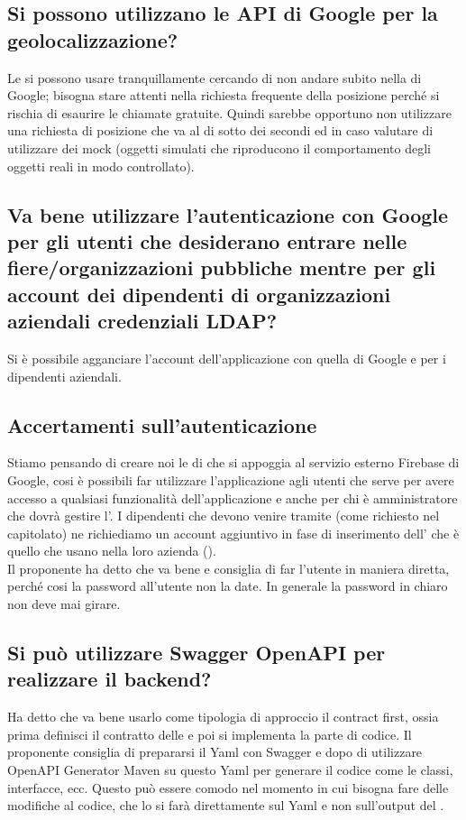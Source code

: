 \subsection{Si possono utilizzano le API di Google per la geolocalizzazione?}
Le si possono usare tranquillamente cercando di non andare subito nella  di Google; bisogna stare attenti nella richiesta frequente della posizione perché si rischia 
di esaurire le chiamate gratuite. Quindi sarebbe opportuno non utilizzare una richiesta di posizione che va al di sotto dei secondi ed in caso valutare di utilizzare dei 
mock (oggetti simulati che riproducono il comportamento degli oggetti reali in modo controllato).

\newpage
\subsection{Va bene utilizzare l'autenticazione con Google per gli utenti che desiderano entrare nelle fiere/organizzazioni pubbliche mentre per gli account dei dipendenti 
di organizzazioni aziendali  credenziali LDAP?}
Si è possibile agganciare l'account dell'applicazione con quella di Google e  per i dipendenti aziendali.

\subsection{Accertamenti sull'autenticazione}
Stiamo pensando di creare noi le  di  che si appoggia al servizio esterno Firebase di Google, cosi è possibili far utilizzare  l'applicazione agli utenti 
che serve per avere accesso a qualsiasi funzionalità dell'applicazione e anche per chi è amministratore che dovrà gestire l'. I dipendenti che devono venire 
 tramite  (come richiesto nel capitolato) ne richiediamo un account aggiuntivo in fase di inserimento dell' che è quello che usano nella 
loro azienda (). \\
Il proponente ha detto che va bene e consiglia di far  l'utente in maniera diretta, perché cosi la password all'utente non la date. In generale la password in chiaro non 
deve mai girare.

\subsection{Si può utilizzare Swagger OpenAPI per realizzare il backend?}
Ha detto che va bene usarlo come tipologia di approccio il contract first, ossia prima definisci il contratto delle  e poi si implementa la parte di codice.  Il proponente 
consiglia di prepararsi il Yaml con Swagger  e dopo di utilizzare OpenAPI Generator Maven  su questo Yaml per generare il codice come le classi, interfacce, ecc. 
Questo può essere comodo nel momento in cui bisogna fare delle modifiche al codice, che lo si farà direttamente sul Yaml e non sull'output del .

